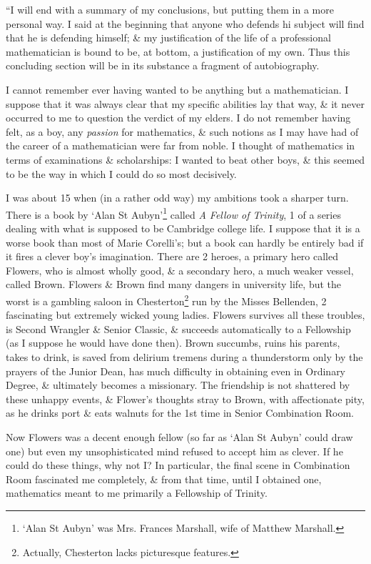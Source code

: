 \documentclass{article}
\numberwithin{equation}{section}
\begin{document}
 ``I will end with a summary of my conclusions, but putting them in a more personal way. I said at the beginning that anyone who defends hi subject will find that he is defending himself; \& my justification of the life of a professional mathematician is bound to be, at bottom, a justification of my own. Thus this concluding section will be in its substance a fragment of autobiography.

I cannot remember ever having wanted to be anything but a mathematician. I suppose that it was always clear that my specific abilities lay that way, \& it never occurred to me to question the verdict of my elders. I do not remember having felt, as a boy, any \textit{passion} for mathematics, \& such notions as I may have had of the career of a mathematician were far from noble. I thought of mathematics in terms of examinations \& scholarships: I wanted to beat other boys, \& this seemed to be the way in which I could do so most decisively.

I was about 15 when (in a rather odd way) my ambitions took a sharper turn. There is a book by `Alan St Aubyn'\footnote{`Alan St Aubyn' was Mrs. Frances Marshall, wife of Matthew Marshall.} called \textit{A Fellow of Trinity}, 1 of a series dealing with what is supposed to be Cambridge college life. I suppose that it is a worse book than most of Marie Corelli's; but a book can hardly be entirely bad if it fires a clever boy's imagination. There are 2 heroes, a primary hero called Flowers, who is almost wholly good, \& a secondary hero, a much weaker vessel, called Brown. Flowers \& Brown find many dangers in university life, but the worst is a gambling saloon in Chesterton\footnote{Actually, Chesterton lacks picturesque features.} run by the Misses Bellenden, 2 fascinating but extremely wicked young ladies. Flowers survives all these troubles, is Second Wrangler \& Senior Classic, \& succeeds automatically to a Fellowship (as I suppose he would have done then). Brown succumbs, ruins his parents, takes to drink, is saved from delirium tremens during a thunderstorm only by the prayers of the Junior Dean, has much difficulty in obtaining even in Ordinary Degree, \& ultimately becomes a missionary. The friendship is not shattered by these unhappy events, \& Flower's thoughts stray to Brown, with affectionate pity, as he drinks port \& eats walnuts for the 1st time in Senior Combination Room.

Now Flowers was a decent enough fellow (so far as `Alan St Aubyn' could draw one) but even my unsophisticated mind refused to accept him as clever. If he could do these things, why not I? In particular, the final scene in Combination Room fascinated me completely, \& from that time, until I obtained one, mathematics meant to me primarily a Fellowship of Trinity.
\end{document}
